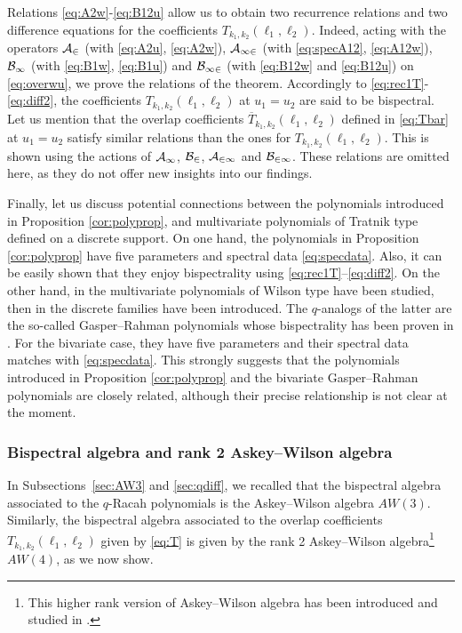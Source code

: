 \documentclass[11pt]{amsart}
\numberwithin{equation}{section}
\numberwithin{equation}{section}
\begin{document}
\proof Relations \eqref{eq:A2w}-\eqref{eq:B12u} allow us to obtain two recurrence relations and two difference equations for the coefficients $T_{k_1,k_2}(\ell_1,\ell_2)$. Indeed, acting with the operators $\cal A_2$ (with \eqref{eq:A2u}, \eqref{eq:A2w}), $\cal A_{12}$ (with \eqref{eq:specA12}, \eqref{eq:A12w}), $\cal B_1$ (with \eqref{eq:B1w}, \eqref{eq:B1u}) and $\cal B_{12}$ (with \eqref{eq:B12w} and \eqref{eq:B12u}) on \eqref{eq:overwu}, we prove the relations of the theorem.
\endproof
 Accordingly to \eqref{eq:rec1T}-\eqref{eq:diff2}, the coefficients $T_{k_1,k_2}(\ell_1,\ell_2)$ at $u_1=u_2$ are said to be bispectral. 
Let us mention that
the overlap coefficients  $\overline{T}_{k_1,k_2}(\ell_1,\ell_2)$ defined in \eqref{eq:Tbar} at $u_1=u_2$ satisfy similar relations than the ones for ${T}_{k_1,k_2}(\ell_1,\ell_2)$. This is shown using the actions of $\cal A_1$, $\cal B_2$, $\cal A_{21}$ and $\cal B_{21}$. These relations are omitted here, as they do not offer new insights into our findings.\vspace{1mm}


Finally, let us discuss potential connections between the polynomials introduced in Proposition \ref{cor:polyprop}, and multivariate polynomials of Tratnik type defined on a discrete support. On one hand,  the polynomials in Proposition \ref{cor:polyprop}
have five parameters and spectral data \eqref{eq:specdata}. Also, it can be easily shown that they enjoy bispectrality using  \eqref{eq:rec1T}--\eqref{eq:diff2}. On the other hand, in \cite{T91a} the multivariate polynomials of Wilson type have been studied, then in \cite{T91b} the discrete families have been introduced. 
The $q$-analogs of the latter are the so-called Gasper--Rahman polynomials \cite{GR05} whose bispectrality has been proven in \cite{I08}.
For the bivariate case, they have five parameters and their spectral data matches with \eqref{eq:specdata}. This strongly suggests that the polynomials introduced in Proposition \ref{cor:polyprop} and the bivariate Gasper--Rahman polynomials are closely related, although their precise relationship is not clear at the moment.






\subsubsection{Bispectral algebra and rank 2 Askey--Wilson algebra}
In Subsections~\ref{sec:AW3} and \ref{sec:qdiff}, we recalled that the bispectral algebra associated to the $q$-Racah polynomials is the Askey--Wilson algebra $AW(3)$. Similarly, the bispectral algebra associated to the overlap coefficients $T_{k_1,k_2}(\ell_1,\ell_2)$  given by \eqref{eq:T} is given by the rank 2 Askey--Wilson algebra\footnote{This higher rank version of Askey--Wilson algebra has been introduced and studied in \cite{PW17,DD18,GW22,CF23}.} $AW(4)$, as we now show. 
\end{document}
